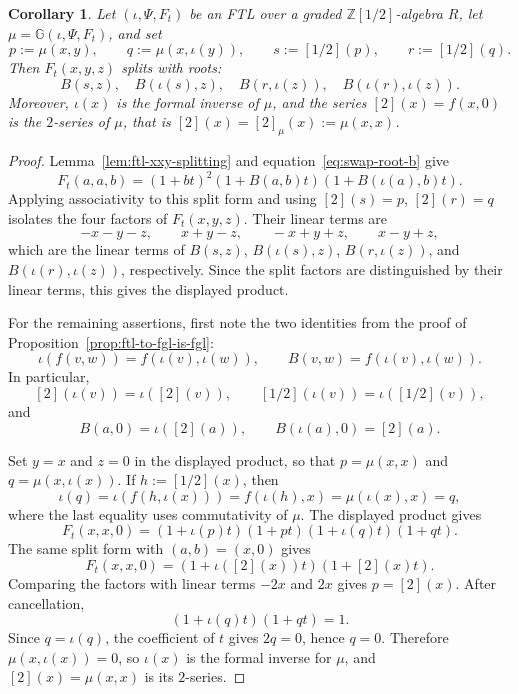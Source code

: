 \documentclass[a4paper]{amsart}
\theoremstyle{plain}
\newtheorem{corollary}[subsubsection]{Corollary}
\theoremstyle{definition}
\newcommand{\ZZ}{\mathbb{Z}}
\begin{document}
\begin{corollary}\label{cor:explicit-ftl-splitting-from-G}
	Let $(\iota,\Psi,F_t)$ be an FTL over a graded $\ZZ[1/2]$-algebra $R$, let $\mu=\mathbb{G}(\iota,\Psi,F_t)$, and set
	\[
		p:=\mu(x,y),\qquad q:=\mu(x,\iota(y)),\qquad s:=[1/2](p),\qquad r:=[1/2](q).
	\]
	Then $F_t(x,y,z)$ splits with roots:
	\[
		B(s,z), \quad B(\iota(s),z), \quad B(r,\iota(z)), \quad B(\iota(r),\iota(z)).
	\]
	Moreover, $\iota(x)$ is the formal inverse of $\mu$, and the series $[2](x)=f(x,0)$ is the $2$-series of $\mu$, that is $[2](x)=[2]_{\mu}(x):=\mu(x,x)$.
\end{corollary}
\begin{proof}
	Lemma~\ref{lem:ftl-xxy-splitting} and equation~\eqref{eq:swap-root-b} give
	\[
		F_t(a,a,b)=(1+bt)^2(1+B(a,b)t)(1+B(\iota(a),b)t).
	\]
	Applying associativity to this split form and using $[2](s)=p$, $[2](r)=q$ isolates the four factors of $F_t(x,y,z)$. Their linear terms are
	\[
		-x-y-z,\qquad x+y-z,\qquad -x+y+z,\qquad x-y+z,
	\]
	which are the linear terms of $B(s,z)$, $B(\iota(s),z)$, $B(r,\iota(z))$, and $B(\iota(r),\iota(z))$, respectively. Since the split factors are distinguished by their linear terms, this gives the displayed product.

	For the remaining assertions, first note the two identities from the proof of Proposition~\ref{prop:ftl-to-fgl-is-fgl}:
	\[
		\iota(f(v,w))=f(\iota(v),\iota(w)),\qquad B(v,w)=f(\iota(v),\iota(w)).
	\]
	In particular,
	\[
		[2](\iota(v))=\iota([2](v)),\qquad [1/2](\iota(v))=\iota([1/2](v)),
	\]
	and
	\[
		B(a,0)=\iota([2](a)),\qquad B(\iota(a),0)=[2](a).
	\]

	Set $y=x$ and $z=0$ in the displayed product, so that $p=\mu(x,x)$ and $q=\mu(x,\iota(x))$. If $h:=[1/2](x)$, then
	\[
		\iota(q)=\iota(f(h,\iota(x)))=f(\iota(h),x)=\mu(\iota(x),x)=q,
	\]
	where the last equality uses commutativity of $\mu$. The displayed product gives
	\[
		F_t(x,x,0)=(1+\iota(p)t)(1+pt)(1+\iota(q)t)(1+qt).
	\]
	The same split form with $(a,b)=(x,0)$ gives
	\[
		F_t(x,x,0)=(1+\iota([2](x))t)(1+[2](x)t).
	\]
	Comparing the factors with linear terms $-2x$ and $2x$ gives $p=[2](x)$. After cancellation,
	\[
		(1+\iota(q)t)(1+qt)=1.
	\]
	Since $q=\iota(q)$, the coefficient of $t$ gives $2q=0$, hence $q=0$. Therefore $\mu(x,\iota(x))=0$, so $\iota(x)$ is the formal inverse for $\mu$, and $[2](x)=\mu(x,x)$ is its $2$-series.
\end{proof}
\end{document}
